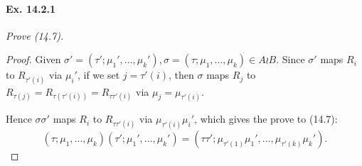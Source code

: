 \documentclass[11pt,a4paper]{article}
\begin{document}
\paragraph{Ex. 14.2.1}

{\it Prove (14.7).
}

\begin{proof}
Given $\sigma'=(\tau';\mu_1',...,\mu_k'),\sigma=(\tau;\mu_1,...,\mu_k)\in A\wr B$. Since $\sigma'$ maps $R_i$ to $R_{\tau'(i)}$ via $\mu_i'$, if we set $j=\tau'(i)$, then $\sigma$ maps $R_j$ to $R_{\tau(j)}=R_{\tau(\tau'(i))}=R_{\tau\tau'(i)}$ via $\mu_j=\mu_{\tau'(i)}$.

Hence $\sigma\sigma'$ maps $R_i$ to $R_{\tau\tau'(i)}$ via $\mu_{\tau'(i)}\mu_i'$, which gives the prove to (14.7):
$$(\tau;\mu_1,...,\mu_k)(\tau';\mu_1',...,\mu_k')=(\tau\tau';\mu_{\tau'(1)}\mu_1',...,\mu_{\tau'(k)}\mu_k').$$
\end{proof}
\end{document}
